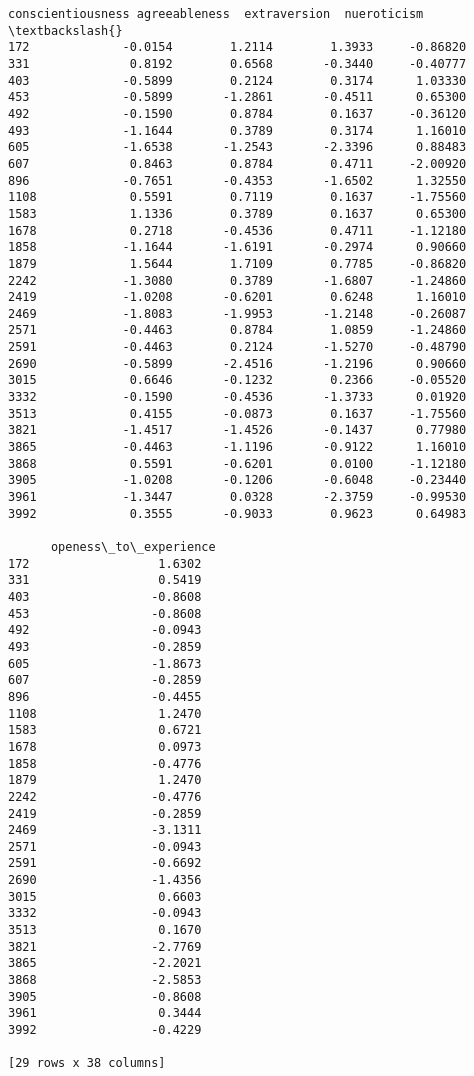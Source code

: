 \documentclass[11pt]{article}
\begin{document}
\begin{tcolorbox}[breakable, size=fbox, boxrule=.5pt, pad at break*=1mm, opacityfill=0]
\begin{Verbatim}[commandchars=\\\{\}]
      conscientiousness agreeableness  extraversion  nueroticism  \textbackslash{}
172             -0.0154        1.2114        1.3933     -0.86820
331              0.8192        0.6568       -0.3440     -0.40777
403             -0.5899        0.2124        0.3174      1.03330
453             -0.5899       -1.2861       -0.4511      0.65300
492             -0.1590        0.8784        0.1637     -0.36120
493             -1.1644        0.3789        0.3174      1.16010
605             -1.6538       -1.2543       -2.3396      0.88483
607              0.8463        0.8784        0.4711     -2.00920
896             -0.7651       -0.4353       -1.6502      1.32550
1108             0.5591        0.7119        0.1637     -1.75560
1583             1.1336        0.3789        0.1637      0.65300
1678             0.2718       -0.4536        0.4711     -1.12180
1858            -1.1644       -1.6191       -0.2974      0.90660
1879             1.5644        1.7109        0.7785     -0.86820
2242            -1.3080        0.3789       -1.6807     -1.24860
2419            -1.0208       -0.6201        0.6248      1.16010
2469            -1.8083       -1.9953       -1.2148     -0.26087
2571            -0.4463        0.8784        1.0859     -1.24860
2591            -0.4463        0.2124       -1.5270     -0.48790
2690            -0.5899       -2.4516       -1.2196      0.90660
3015             0.6646       -0.1232        0.2366     -0.05520
3332            -0.1590       -0.4536       -1.3733      0.01920
3513             0.4155       -0.0873        0.1637     -1.75560
3821            -1.4517       -1.4526       -0.1437      0.77980
3865            -0.4463       -1.1196       -0.9122      1.16010
3868             0.5591       -0.6201        0.0100     -1.12180
3905            -1.0208       -0.1206       -0.6048     -0.23440
3961            -1.3447        0.0328       -2.3759     -0.99530
3992             0.3555       -0.9033        0.9623      0.64983

      openess\_to\_experience
172                  1.6302
331                  0.5419
403                 -0.8608
453                 -0.8608
492                 -0.0943
493                 -0.2859
605                 -1.8673
607                 -0.2859
896                 -0.4455
1108                 1.2470
1583                 0.6721
1678                 0.0973
1858                -0.4776
1879                 1.2470
2242                -0.4776
2419                -0.2859
2469                -3.1311
2571                -0.0943
2591                -0.6692
2690                -1.4356
3015                 0.6603
3332                -0.0943
3513                 0.1670
3821                -2.7769
3865                -2.2021
3868                -2.5853
3905                -0.8608
3961                 0.3444
3992                -0.4229

[29 rows x 38 columns]
\end{Verbatim}
\end{tcolorbox}
        
\end{document}
